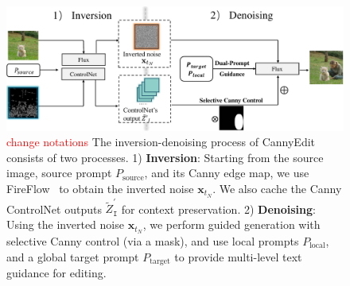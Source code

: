 \documentclass{article}
\newenvironment{cyanpar}{\color{cyan}}{}
\begin{document}
\begin{cyanpar}
\end{cyanpar}





\begin{figure}[t]
    \centering
    \includegraphics[width=0.8\linewidth]{figures/framework3.pdf}
    \vspace{-1mm}
    \caption{\textcolor{red}{change notations} The inversion-denoising process of CannyEdit consists of two processes. 1) \textbf{Inversion}: Starting from the source image, source prompt \( P_\text{source} \), and its Canny edge map, we use FireFlow~\citep{deng2024fireflow} to obtain the inverted noise \( \mathbf{x}_{t_N} \). We also cache the Canny ControlNet outputs \( \tilde{Z}^{\prime}_{\texttt{I}} \) for context preservation. 2) \textbf{Denoising}: Using the inverted noise \( \mathbf{x}_{t_N} \), we perform guided generation with selective Canny control (via a mask), and use local prompts \( P_\text{local} \), and a global target prompt \( P_\text{target} \) to provide multi-level text guidance for editing.}

\end{figure}
\end{document}
